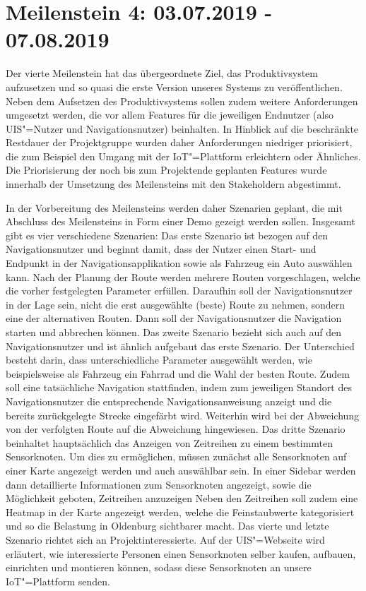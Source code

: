 \section{Meilenstein 4: 03.07.2019 - 07.08.2019}
Der vierte Meilenstein hat das übergeordnete Ziel, das Produktivsystem aufzusetzen und so quasi die erste Version unseres Systems zu veröffentlichen.
Neben dem Aufsetzen des Produktivsystems sollen zudem weitere Anforderungen umgesetzt werden, die vor allem Features für die jeweiligen Endnutzer (also UIS"=Nutzer und Navigationsnutzer) beinhalten.
In Hinblick auf die beschränkte Restdauer der Projektgruppe wurden daher Anforderungen niedriger priorisiert, die zum Beispiel den Umgang mit der IoT"=Plattform erleichtern oder Ähnliches.
Die Priorisierung der noch bis zum Projektende geplanten Features wurde innerhalb der Umsetzung des Meilensteins mit den Stakeholdern abgestimmt.


In der Vorbereitung des Meilensteins werden daher Szenarien geplant, die mit Abschluss des Meilensteins in Form einer Demo gezeigt werden sollen.
Insgesamt gibt es vier verschiedene Szenarien: Das erste Szenario ist bezogen auf den Navigationsnutzer und beginnt damit, dass der Nutzer einen Start- und Endpunkt in der Navigationsapplikation sowie als Fahrzeug ein Auto auswählen kann.
Nach der Planung der Route werden mehrere Routen vorgeschlagen, welche die vorher festgelegten Parameter erfüllen.
Daraufhin soll der Navigationsnutzer in der Lage sein, nicht die erst ausgewählte (beste) Route zu nehmen, sondern eine der alternativen Routen.
Dann soll der Navigationsnutzer die Navigation starten und abbrechen können.
Das zweite Szenario bezieht sich auch auf den Navigationsnutzer und ist ähnlich aufgebaut das erste Szenario.
Der Unterschied besteht darin, dass unterschiedliche Parameter ausgewählt werden, wie beispielsweise als Fahrzeug ein Fahrrad und die Wahl der besten Route.
Zudem soll eine tatsächliche Navigation stattfinden, indem zum jeweiligen Standort des Navigationsnutzer die entsprechende Navigationsanweisung anzeigt und die bereits zurückgelegte Strecke eingefärbt wird.
Weiterhin wird bei der Abweichung von der verfolgten Route auf die Abweichung hingewiesen.
Das dritte Szenario beinhaltet hauptsächlich das Anzeigen von Zeitreihen zu einem bestimmten Sensorknoten.
Um dies zu ermöglichen, müssen zunächst alle Sensorknoten auf einer Karte angezeigt werden und auch auswählbar sein.
In einer Sidebar werden dann detaillierte Informationen zum Sensorknoten angezeigt, sowie die Möglichkeit geboten, Zeitreihen anzuzeigen
 Neben den Zeitreihen soll zudem eine Heatmap in der Karte angezeigt werden, welche die Feinstaubwerte kategorisiert und so die Belastung in Oldenburg sichtbarer macht.
Das vierte und letzte Szenario richtet sich an Projektinteressierte.
Auf der UIS"=Webseite wird erläutert, wie interessierte Personen einen Sensorknoten selber kaufen, aufbauen, einrichten und montieren können, sodass diese Sensorknoten an unsere IoT"=Plattform senden.


